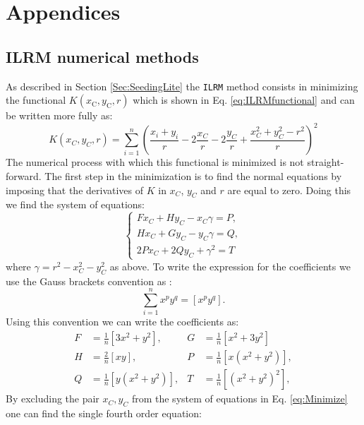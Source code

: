 \begin{savequote}[8cm]
\end{savequote}

\chapter{\label{app:1-cardiophys}Appendices}

\minitoc

\section{ILRM numerical methods}
\label{App:ILRM}
As described in Section \ref{Sec:SeedingLite} the \texttt{ILRM} method consists in minimizing the functional $K(x_\text{C},y_\text{C},r)$ which is shown in Eq. \ref{eq:ILRMfunctional} and can be written more fully as:
\begin{equation}
    K(x_C,y_C,r)=\sum_{i=1}^{n}\left(\frac{x_i+y_i}{r}-2\frac{x_C}{r}-2\frac{y_C}{r}+\frac{x_C^2+y_C^2-r^2}{r}\right)^2
\end{equation}
The numerical process with which this functional is minimized is not straight-forward. The first step in the minimization is to find the normal equations by imposing that the derivatives of $K$ in $x_C$, $y_C$ and $r$ are equal to zero. Doing this we find the system of equations:
\begin{equation}\label{eq:Minimize}
\begin{cases} 
Fx_C+Hy_C-x_C\gamma=P, \\
Hx_C+Gy_C-y_C\gamma=Q, \\
2Px_C+2Qy_C+\gamma^2=T
\end{cases}
\end{equation}
where $\gamma=r^2-x_C^2-y_C^2$ as above. To write the expression for the coefficients we use the Gauss brackets convention as :
\begin{equation}
    \sum_{i=1}^{n}x^py^q=[x^py^q].
\end{equation}
Using this convention we can write the coefficients as:
\begin{align}\label{eq:coeff}
F&=\frac{1}{n}[3x^2+y^2],&  G &=\frac{1}{n}[x^2+3y^2] \nonumber\\
H&=\frac{2}{n}[xy],      &  P&=\frac{1}{n}[x(x^2+y^2)],   \\
Q&=\frac{1}{n}[y(x^2+y^2)],   &  T&=\frac{1}{n}[(x^2+y^2)^2] \nonumber, 
\end{align}
By excluding the pair $x_C,y_C$ from the system of equations in Eq. \ref{eq:Minimize} one can find the single fourth order equation:
